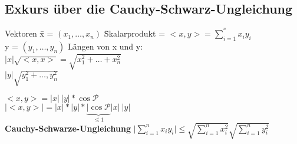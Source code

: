 \subsection{Exkurs über die Cauchy-Schwarz-Ungleichung}
\begin{tabbing}
	Vektoren \= x = $(x_1,\dots,x_n)$ \hspace{1cm}\= Skalarprodukt = $<x,y> = \sum_{i=1}^{^n}x_iy_i$\\
	\> y = $(y_1,\dots,y_n)$\> Längen von x und y:\\
	\>\>$\vert x \vert \sqrt{<x,x>}=\sqrt{x_1^2 +\dots+x_n^2}$\\
	\>\>$\vert y \vert \sqrt{y_1^2+\dots,y_n^2}$
\end{tabbing}
$<x,y> = \vert x \vert\: \vert y \vert * \cos \mathcal{P}$\medskip\\
$\vert <x,y>\vert = |x|*|y|*\underbrace{|\cos \mathcal{P}}_{\leq 1}|x|\:|y|$\medskip\\
\textbf{Cauchy-Schwarze-Ungleichung}
$\vert \sum_{i=1}^nx_iy_i\vert \leq \sqrt{\sum_{i=1}^nx_i^2}\sqrt{\sum_{i=1}^ny_i^2}$

